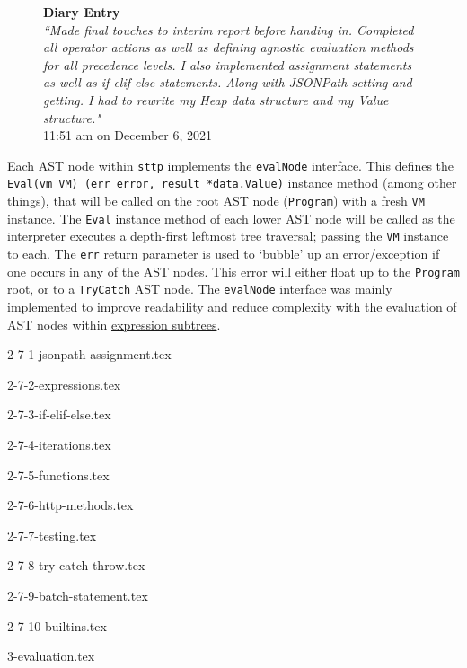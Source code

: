 \documentclass[]{full}
\theoremstyle{definition}
\begin{document}
\begin{figure}[H]
    \begin{center}
        \textbf{Diary Entry}\\[0.5em]
        \textit{``Made final touches to interim report before handing in. Completed all operator actions as well as defining agnostic evaluation methods for all precedence levels. I also implemented assignment statements as well as if-elif-else statements. Along with JSONPath setting and getting. I had to rewrite my Heap data structure and my Value structure."}\\[0.5em]
        \tiny{11:51 am on December 6, 2021}
    \end{center}
\end{figure}
    
Each AST node within \verb|sttp| implements the \verb|evalNode| interface. This defines the \texttt{Eval(vm VM) (err error, result *data.Value)} instance method (among other things), that will be called on the root AST node (\verb|Program|) with a fresh \verb|VM| instance. The \verb|Eval| instance method of each lower AST node will be called as the interpreter executes a depth-first leftmost tree traversal; passing the \verb|VM| instance to each. The \verb|err| return parameter is used to `bubble' up an error/exception if one occurs in any of the AST nodes. This error will either float up to the \verb|Program| root, or to a \verb|TryCatch| AST node. The \verb|evalNode| interface was mainly implemented to improve readability and reduce complexity with the evaluation of AST nodes within \hyperref[sec:development-ast-nodes-expressions]{expression subtrees}.

{2-7-1-jsonpath-assignment.tex}

{2-7-2-expressions.tex}

{2-7-3-if-elif-else.tex}

{2-7-4-iterations.tex}

{2-7-5-functions.tex}

{2-7-6-http-methods.tex}

{2-7-7-testing.tex}

{2-7-8-try-catch-throw.tex}

{2-7-9-batch-statement.tex}

{2-7-10-builtins.tex}

{3-evaluation.tex}
\end{document}
